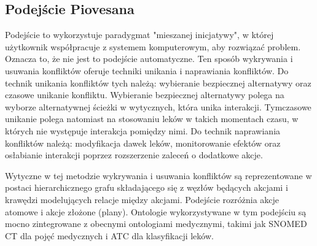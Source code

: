 \subsection{Podejście Piovesana}
Podejście to wykorzystuje paradygmat "mieszanej inicjatywy", w której użytkownik współpracuje z systemem komputerowym, aby rozwiązać problem.\cite{Piovesan} Oznacza to, że nie jest to podejście automatyczne. Ten sposób wykrywania i usuwania konfliktów oferuje techniki unikania i naprawiania konfliktów. Do technik unikania konfliktów tych należą: wybieranie bezpiecznej alternatywy oraz czasowe unikanie konfliktu. Wybieranie bezpiecznej alternatywy polega na wyborze alternatywnej ścieżki w wytycznych, która unika interakcji. Tymczasowe unikanie polega natomiast na stosowaniu leków w takich momentach czasu, w których nie występuje interakcja pomiędzy nimi. Do technik naprawiania konfliktów należą: modyfikacja dawek leków, monitorowanie efektów oraz osłabianie interakcji poprzez rozszerzenie zaleceń o dodatkowe akcje. 

Wytyczne w tej metodzie wykrywania i usuwania konfliktów są reprezentowane w postaci hierarchicznego grafu składającego się z węzłów będących akcjami i krawędzi modelujących relacje między akcjami. Podejście rozróżnia akcje atomowe i akcje złożone (plany). Ontologie wykorzystywane w tym podejściu są mocno zintegrowane z obecnymi ontologiami medycznymi, takimi jak SNOMED CT dla pojęć medycznych i ATC dla klasyfikacji leków.



